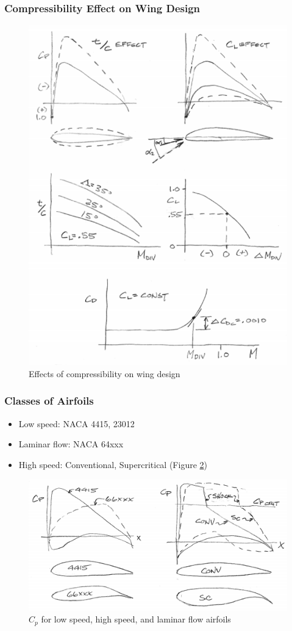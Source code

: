 \documentclass[draft=false, titlepage]{article}
\begin{document}
\subsubsection{Compressibility Effect on Wing Design}
\begin{figure}[ht]
	\centering
	\includegraphics[width=0.8\linewidth]{Figures/p60_compressibilityWingEffects.PNG}
	\caption{Effects of compressibility on wing design}
	\label{fig:p60_compressibilityWingEffects}
\end{figure}
\clearpage

\subsubsection{Classes of Airfoils}
\begin{itemize}
	\item Low speed: NACA 4415, 23012
	\item Laminar flow: NACA 64xxx
	\item High speed: Conventional, Supercritical (Figure \ref{fig:p61_AirfoilCpDistribution})
\end{itemize}

\begin{figure}[ht]
	\centering
	\includegraphics[width=0.8\linewidth]{Figures/p61_AirfoilCpDistribution.PNG}
	\caption{$C_p$ for low speed, high speed, and laminar flow airfoils}
	\label{fig:p61_AirfoilCpDistribution}
\end{figure}
\end{document}
